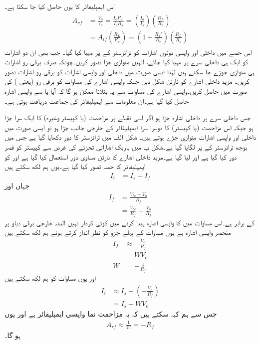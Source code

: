 اس ایمپلیفائر کا  یوں حاصل کیا جا سکتا ہے۔
\begin{gather}
\begin{aligned}
A_{vf}&=\frac{V_o}{V_s}=\frac{I_o R_L}{I_s R_s}=\left (\frac{I_o}{I_s} \right) \left (\frac{R_L}{R_s} \right) \\
&=A_{if} \left(\frac{R_L}{R_s} \right)=\left( 1+\frac{R_f'}{R_e}\right) \left(\frac{R_L}{R_s} \right)
\end{aligned}
\end{gather}
%
اس حصے میں  داخلی اور واپسی دونوں اشارات کو ٹرانزسٹر کے  پر مہیا کیا گیا۔ جب بھی ان  دو اشارات کو ایک ہی داخلی سرے پر مہیا کیا جائے، انہیں متوازی جڑا تصور کریں۔چونکہ صرف برقی رو اشارات ہی متوازی جوڑے جا سکتے ہیں لہٰذا ایسی صورت میں داخلی اور واپسی اشارات کو برقی رو اشارات تصور کریں۔ مزید داخلی اشارے کو نارٹن شکل دیں جبکہ واپسی اشارے کی مساوات کو برقی رو (یعنی ) کی صورت میں حاصل کریں۔واپسی اشارے کی مساوات سے یہ بتلانا ممکن ہو گا کہ آیا  یا  سے واپسی اشارہ حاصل کیا گیا ہے۔ان معلومات سے ایمپلیفائر کی جماعت دریافت ہوتی ہے۔ 

 جس داخلی سرے پر داخلی اشارہ جڑا ہو اگر اسی نقطے پر مزاحمت (یا کپیسٹر وغیرہ) کا ایک سرا جڑا ہو جبکہ اس مزاحمت (یا کپیسٹر) کا دوسرا سرا ایمپلیفائر کے خارجی جانب جڑا ہو تو ایسی صورت میں داخلی اور واپسی اشارات متوازی جڑے ہوتے ہیں۔
شکل  الف میں ٹرانزسٹر کا دور دکھایا گیا ہے جس میں بوجھ  ٹرانزسٹر کے  پر لگایا گیا ہے۔شکل  ب میں باریک اشاراتی تجزئے کی غرض سے کپیسٹر کو قصر دور کیا گیا ہے اور   لیا گیا ہے۔مزید داخلی اشارے کا نارٹن مساوی دور استعمال کیا گیا ہے اور  کو ایمپلیفائر کا حصہ تصور کیا گیا ہے۔یوں ہم لکھ سکتے ہیں
\begin{align} \label{مساوات_واپسی_مزاحمت_نما_واپسی_رو_اشارہ}
I_i&=I_s-I_f
\end{align}
جہاں  اور
\begin{align*}
I_f&=\frac{V_{be}-V_o}{R_f} \\
&=\frac{V_{be}}{R_f}-\frac{V_o}{R_f}
\end{align*}
کے برابر ہے۔اس مساوات میں  کا واپسی اشارہ پیدا کرنے میں کوئی کردار نہیں البتہ  خارجی برقی دباو پر منحصر واپسی اشارہ ہے یوں مساوات کے پہلے جزو کو نظر انداز کرتے ہوئے ہم لکھ سکتے ہیں
\begin{align*}
I_f & \approx -\frac{V_o}{R_f} \\
&=W V_o \\
W&=-\frac{1}{R_f}
\end{align*}
اور یوں مساوات  کو ہم لکھ سکتے ہیں
\begin{align*}
I_i &\approx I_s-\left(-\frac{V_o}{R_f} \right) \\
&=I_s-W V_o
\end{align*}
جس سے ہم کہہ سکتے ہیں کہ یہ مزاحمت نما واپسی ایمپلیفائر ہے اور یوں
\begin{align}
A_{rf} \approx \frac{1}{W}=-R_f
\end{align}
ہو گا۔

